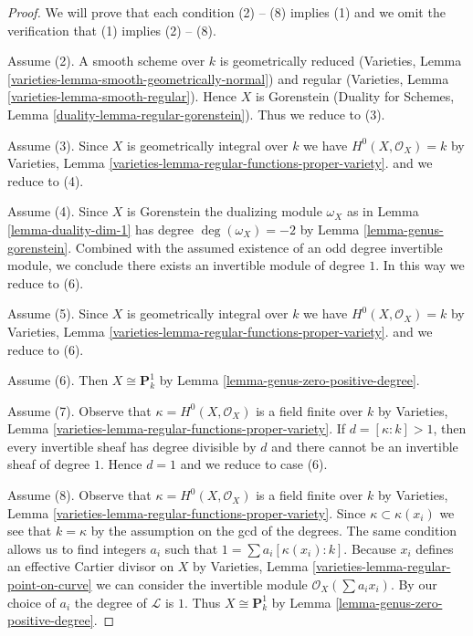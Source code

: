 \documentclass{stacks-project}
\theoremstyle{plain}
\theoremstyle{definition}
\theoremstyle{remark}
\numberwithin{equation}{subsection}
\begin{document}
\begin{proof}
We will prove that each condition (2) -- (8) implies (1) and we omit
the verification that (1) implies (2) -- (8).

\medskip\noindent
Assume (2). A smooth scheme over $k$ is geometrically reduced
(Varieties, Lemma \ref{varieties-lemma-smooth-geometrically-normal})
and regular (Varieties, Lemma \ref{varieties-lemma-smooth-regular}).
Hence $X$ is Gorenstein (Duality for Schemes, Lemma
\ref{duality-lemma-regular-gorenstein}).
Thus we reduce to (3).

\medskip\noindent
Assume (3). Since $X$ is geometrically integral over $k$ we have
$H^0(X, \mathcal{O}_X) = k$ by
Varieties, Lemma \ref{varieties-lemma-regular-functions-proper-variety}.
and we reduce to (4).

\medskip\noindent
Assume (4). Since $X$ is Gorenstein the dualizing module
$\omega_X$ as in Lemma \ref{lemma-duality-dim-1} has degree
$\deg(\omega_X) = -2$ by Lemma \ref{lemma-genus-gorenstein}.
Combined with the assumed existence of an odd degree invertible
module, we conclude there exists an invertible module of degree $1$.
In this way we reduce to (6).

\medskip\noindent
Assume (5). Since $X$ is geometrically integral over $k$ we have
$H^0(X, \mathcal{O}_X) = k$ by
Varieties, Lemma \ref{varieties-lemma-regular-functions-proper-variety}.
and we reduce to (6).

\medskip\noindent
Assume (6). Then $X \cong \mathbf{P}^1_k$ by
Lemma \ref{lemma-genus-zero-positive-degree}.

\medskip\noindent
Assume (7). Observe that $\kappa = H^0(X, \mathcal{O}_X)$ is a field
finite over $k$ by
Varieties, Lemma \ref{varieties-lemma-regular-functions-proper-variety}.
If $d = [\kappa : k] > 1$, then every invertible sheaf has degree
divisible by $d$ and there cannot be an invertible sheaf of degree $1$.
Hence $d = 1$ and we reduce to case (6).

\medskip\noindent
Assume (8). Observe that $\kappa = H^0(X, \mathcal{O}_X)$ is a field
finite over $k$ by
Varieties, Lemma \ref{varieties-lemma-regular-functions-proper-variety}.
Since $\kappa \subset \kappa(x_i)$ we see that $k = \kappa$
by the assumption on the gcd of the degrees. The same condition
allows us to find integers $a_i$ such that
$1 = \sum a_i[\kappa(x_i) : k]$. Because $x_i$ defines an
effective Cartier divisor on $X$ by
Varieties, Lemma \ref{varieties-lemma-regular-point-on-curve}
we can consider the invertible module $\mathcal{O}_X(\sum a_i x_i)$.
By our choice of $a_i$ the degree of $\mathcal{L}$ is $1$.
Thus $X \cong \mathbf{P}^1_k$ by Lemma \ref{lemma-genus-zero-positive-degree}.
\end{proof}
\end{document}

